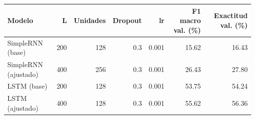 \begin{tabular}{lrrrrrr}
\toprule
Modelo & L & Unidades & Dropout & lr & F1 macro val. (\%) & Exactitud val. (\%) \\
\midrule
SimpleRNN (base) & 200 & 128 & 0.3 & 0.001 & 15.62 & 16.43 \\
SimpleRNN (ajustado) & 400 & 256 & 0.3 & 0.001 & 26.43 & 27.80 \\
LSTM (base) & 200 & 128 & 0.3 & 0.001 & 53.75 & 54.24 \\
LSTM (ajustado) & 400 & 128 & 0.3 & 0.001 & 55.62 & 56.36 \\
\bottomrule
\end{tabular}
